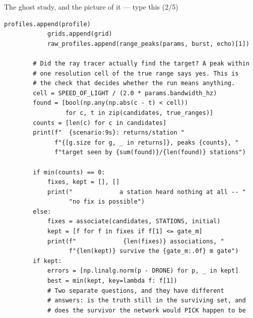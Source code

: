 \documentclass[10pt]{beamer}
\begin{document}
\begin{frame}[fragile]{The ghost study, and the picture of it --- type this (2/5)}
\begin{lstlisting}[basicstyle=\ttfamily\tiny]
            profiles.append(profile)
            grids.append(grid)
            raw_profiles.append(range_peaks(params, burst, echo)[1])

        # Did the ray tracer actually find the target? A peak within
        # one resolution cell of the true range says yes. This is
        # the check that decides whether the run means anything.
        cell = SPEED_OF_LIGHT / (2.0 * params.bandwidth_hz)
        found = [bool(np.any(np.abs(c - t) < cell))
                 for c, t in zip(candidates, true_ranges)]
        counts = [len(c) for c in candidates]
        print(f"  {scenario:9s}: returns/station "
              f"{[g.size for g, _ in returns]}, peaks {counts}, "
              f"target seen by {sum(found)}/{len(found)} stations")

        if min(counts) == 0:
            fixes, kept = [], []
            print("             a station heard nothing at all -- "
                  "no fix is possible")
        else:
            fixes = associate(candidates, STATIONS, initial)
            kept = [f for f in fixes if f[1] <= gate_m]
            print(f"             {len(fixes)} associations, "
                  f"{len(kept)} survive the {gate_m:.0f} m gate")
        if kept:
            errors = [np.linalg.norm(p - DRONE) for p, _ in kept]
            best = min(kept, key=lambda f: f[1])
            # Two separate questions, and they have different
            # answers: is the truth still in the surviving set, and
            # does the survivor the network would PICK happen to be
\end{lstlisting}
\end{frame}
\end{document}
